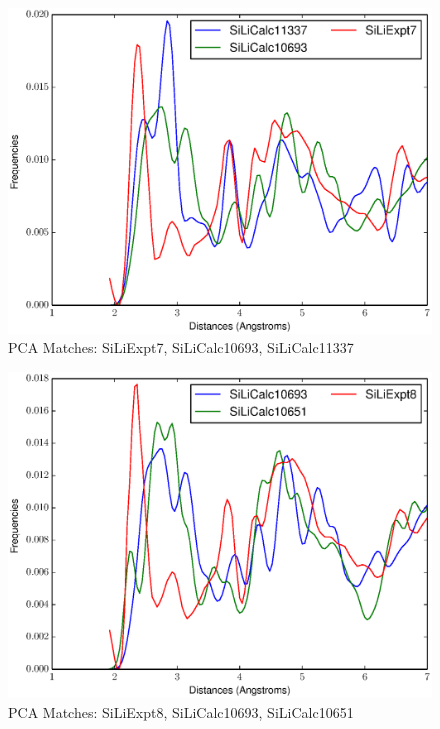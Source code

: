 \documentclass[12pt,letterpaper]{article}
\begin{document}
\begin{figure}[ht]
\begin{center}
\includegraphics[scale=0.8]{figs/PC128MatchSiLiExpt7-SiLiCalc10693-SiLiCalc11337.eps}
\caption{PCA Matches: SiLiExpt7, SiLiCalc10693, SiLiCalc11337}
\end{center}
\end{figure}

\begin{figure}[ht]
\begin{center}
\includegraphics[scale=0.8]{figs/PC128MatchSiLiExpt8-SiLiCalc10693-SiLiCalc10651.eps}
\caption{PCA Matches: SiLiExpt8, SiLiCalc10693, SiLiCalc10651}
\end{center}
\end{figure}
\end{document}
